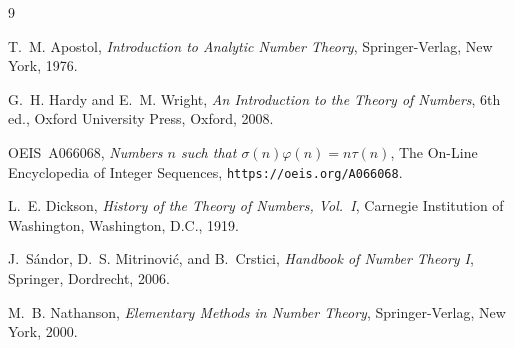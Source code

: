 \documentclass[12pt]{article}
\begin{document}
\begin{thebibliography}{9}

T.~M. Apostol,
\textit{Introduction to Analytic Number Theory},
Springer-Verlag, New York, 1976.

G.~H. Hardy and E.~M. Wright,
\textit{An Introduction to the Theory of Numbers},
6th ed., Oxford University Press, Oxford, 2008.

OEIS~A066068,
\textit{Numbers $n$ such that $\sigma(n)\varphi(n) = n\tau(n)$},
The On-Line Encyclopedia of Integer Sequences,
\texttt{https://oeis.org/A066068}.

L.~E. Dickson,
\textit{History of the Theory of Numbers, Vol.~I},
Carnegie Institution of Washington, Washington, D.C., 1919.

J.~S\'{a}ndor, D.~S. Mitrinovi\'{c}, and B.~Crstici,
\textit{Handbook of Number Theory I},
Springer, Dordrecht, 2006.

M.~B. Nathanson,
\textit{Elementary Methods in Number Theory},
Springer-Verlag, New York, 2000.

\end{thebibliography}
\end{document}
